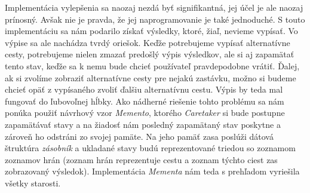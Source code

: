 Implementácia vylepšenia sa naozaj nezdá byť signifikantná, jej účel je ale naozaj prínosný. Avšak nie je pravda, že jej naprogramovanie je také jednoduché. S touto implementáciu sa nám podarilo získať výsledky, ktoré, žiaľ, nevieme vypísať. Vo výpise sa ale nachádza tvrdý oriešok. Keďže potrebujeme vypísať alternatívne cesty, potrebujeme nielen zmazať predošlý výpis výsledkov, ale si aj zapamätať tento stav, keďže sa k nemu bude chcieť používateľ pravdepodobne vrátiť. Ďalej, ak si zvolíme zobraziť alternatívne cesty pre nejakú zastávku, možno si budeme chcieť opäť z vypísaného zvoliť ďalšiu alternatívnu cestu. Výpis by teda mal fungovať do ľubovoľnej hĺbky. Ako nádherné riešenie tohto problému sa nám ponúka použiť návrhový vzor \textit{Memento}, ktorého \textit{Caretaker} si bude postupne zapamätávať stavy a na žiadosť nám posledný zapamätaný stav poskytne a zároveň ho odstráni zo svojej pamäte. Na jeho pamäť zasa poslúži dátová štruktúra \textit{zásobník} a ukladané stavy budú reprezentované triedou so zoznamom zoznamov hrán (zoznam hrán reprezentuje cestu a zoznam týchto ciest zas zobrazovaný výsledok). Implementácia \textit{Mementa} nám teda s prehľadom vyriešila všetky starosti.\newline

